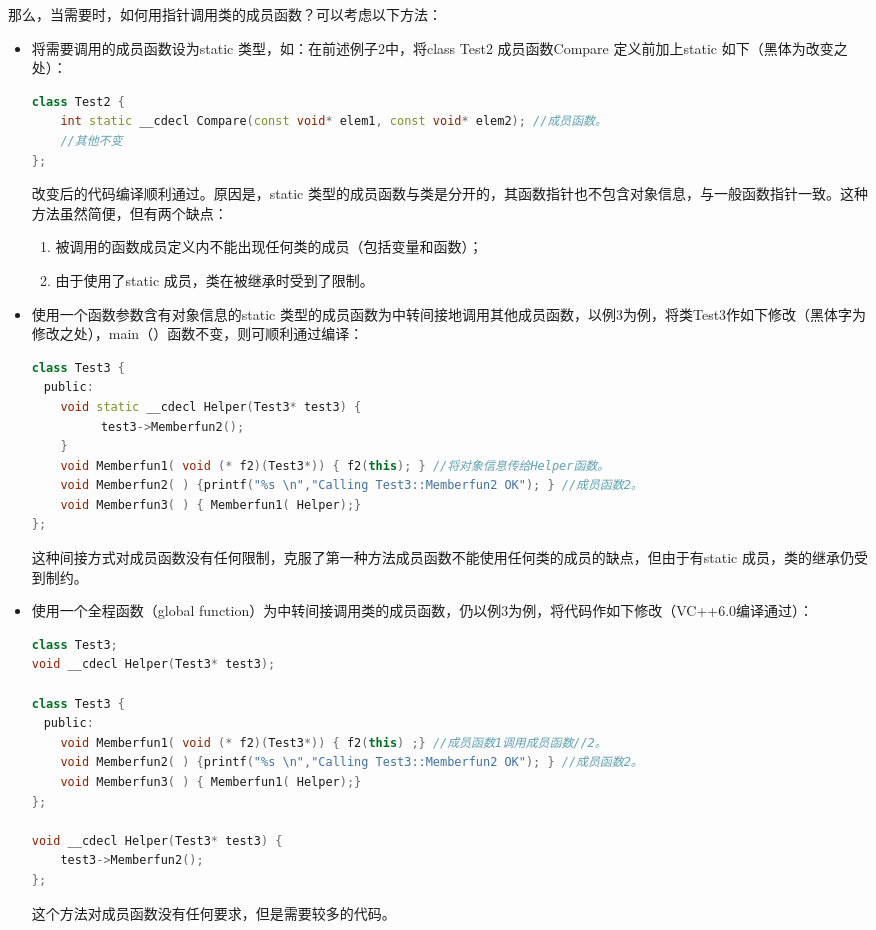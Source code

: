 \documentclass{article}
\begin{document}
\begin{CJK}{UTF8}{gbsn}
\begin{itemize}
那么，当需要时，如何用指针调用类的成员函数？可以考虑以下方法：
\begin{itemize}
  \itemsep=-3pt
\item 将需要调用的成员函数设为static 类型，如：在前述例子2中，将class Test2 成员函数Compare 定义前加上static 如下（黑体为改变之处）：
\begin{lstlisting}[language=c++]
class Test2 {  
    int static __cdecl Compare(const void* elem1, const void* elem2); //成员函数。  
    //其他不变  
};
\end{lstlisting}
  改变后的代码编译顺利通过。原因是，static 类型的成员函数与类是分开的，其函数指针也不包含对象信息，与一般函数指针一致。这种方法虽然简便，但有两个缺点：
  \begin{enumerate}
    \itemsep=-3pt
  \item 被调用的函数成员定义内不能出现任何类的成员（包括变量和函数）；
  \item 由于使用了static 成员，类在被继承时受到了限制。
  \end{enumerate}
  
\item 使用一个函数参数含有对象信息的static 类型的成员函数为中转间接地调用其他成员函数，以例3为例，将类Test3作如下修改（黑体字为修改之处），main（）函数不变，则可顺利通过编译：
\begin{lstlisting}[language=c++]
class Test3 {  
　public:  
    void static __cdecl Helper(Test3* test3) {  
        　test3->Memberfun2();  
    }  
    void Memberfun1( void (* f2)(Test3*)) { f2(this); } //将对象信息传给Helper函数。  
    void Memberfun2( ) {printf("%s \n","Calling Test3::Memberfun2 OK"); } //成员函数2。  
    void Memberfun3( ) { Memberfun1( Helper);}   
}; 
\end{lstlisting}
这种间接方式对成员函数没有任何限制，克服了第一种方法成员函数不能使用任何类的成员的缺点，但由于有static 成员，类的继承仍受到制约。

\item 使用一个全程函数（global function）为中转间接调用类的成员函数，仍以例3为例，将代码作如下修改（VC++6.0编译通过）：
\begin{lstlisting}[language=c++]
class Test3;  
void __cdecl Helper(Test3* test3);

class Test3 {  
　public:  
    void Memberfun1( void (* f2)(Test3*)) { f2(this) ;} //成员函数1调用成员函数//2。  
    void Memberfun2( ) {printf("%s \n","Calling Test3::Memberfun2 OK"); } //成员函数2。  
    void Memberfun3( ) { Memberfun1( Helper);}   
};  
 
void __cdecl Helper(Test3* test3) {  
    test3->Memberfun2();  
}; 
\end{lstlisting}
这个方法对成员函数没有任何要求，但是需要较多的代码。


\end{itemize}
\end{itemize}
\end{CJK}
\end{document}
